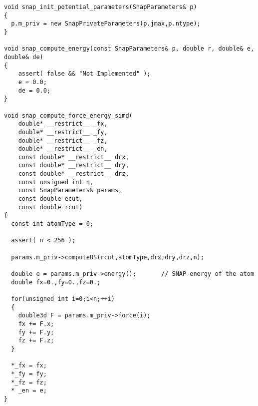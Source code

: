 \documentclass[12pt]{article}
\begin{document}
\begin{lstlisting}
void snap_init_potential_parameters(SnapParameters& p)
{
  p.m_priv = new SnapPrivateParameters(p.jmax,p.ntype);
}

void snap_compute_energy(const SnapParameters& p, double r, double& e, double& de)
{
    assert( false && "Not Implemented" );
    e = 0.0;
    de = 0.0;
}

void snap_compute_force_energy_simd(
	double* __restrict__ _fx,
	double* __restrict__ _fy,
	double* __restrict__ _fz,
	double* __restrict__ _en,
	const double* __restrict__ drx,
	const double* __restrict__ dry,
	const double* __restrict__ drz,
	const unsigned int n,
	const SnapParameters& params,
	const double ecut,
	const double rcut)
{
  const int atomType = 0;

  assert( n < 256 );

  params.m_priv->computeBS(rcut,atomType,drx,dry,drz,n);

  double e = params.m_priv->energy();		// SNAP energy of the atom
  double fx=0.,fy=0.,fz=0.;
  
  for(unsigned int i=0;i<n;++i)
  {
    double3d F = params.m_priv->force(i);
    fx += F.x;
    fy += F.y;
    fz += F.z;
  }
  
  *_fx = fx;
  *_fy = fy;
  *_fz = fz;
  * _en = e;
}
	\end{lstlisting}




  
  
\end{document}
